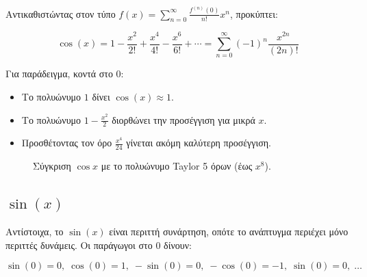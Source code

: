 \documentclass[a4paper, 11pt]{article}
\begin{document}
Αντικαθιστώντας στον τύπο
\(f(x)=\sum_{n=0}^{\infty} \frac{f^{(n)}(0)}{n!}x^n\), προκύπτει:

\[
\cos(x) = 1 - \frac{x^2}{2!} + \frac{x^4}{4!} - \frac{x^6}{6!} + \cdots = \sum_{n=0}^{\infty} (-1)^n \frac{x^{2n}}{(2n)!}
\]

Για παράδειγμα, κοντά στο \(0\):

\begin{itemize}
\item
  Το πολυώνυμο \(1\) δίνει \(\cos(x)\approx 1\).
\item
  Το πολυώνυμο \(1 - \frac{x^2}{2}\) διορθώνει την προσέγγιση για μικρά
  \(x\).
\item
  Προσθέτοντας τον όρο \(\frac{x^4}{24}\) γίνεται ακόμη καλύτερη
  προσέγγιση.
\end{itemize}

\begin{figure}[htbp]
\centering
{}
\caption{Σύγκριση $\cos x$ με το πολυώνυμο Taylor 5 όρων (έως $x^8$).}
\label{fig:costaylor5}
\par
\end{figure}

\subsection{\texorpdfstring{\(\sin(x)\)}{\textbackslash sin(x)}}\label{sinx}

Αντίστοιχα, το \(\sin(x)\) είναι περιττή συνάρτηση, οπότε το ανάπτυγμα
περιέχει μόνο περιττές δυνάμεις. Οι παράγωγοι στο \(0\) δίνουν:

\[
\sin(0)=0,\; \cos(0)=1,\; -\sin(0)=0,\; -\cos(0)=-1,\; \sin(0)=0,\; \dots
\]
\end{document}
